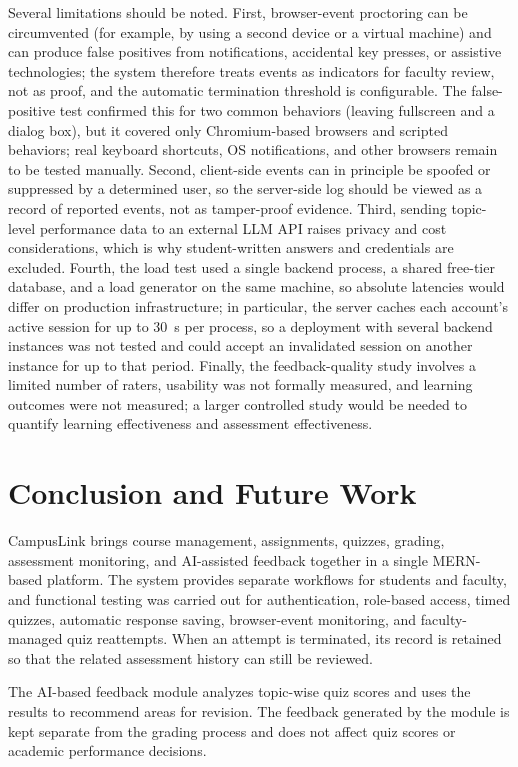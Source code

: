 \documentclass[conference]{IEEEtran}
\begin{document}
Several limitations should be noted. First, browser-event proctoring can be circumvented (for example, by using a second device or a virtual machine) and can produce false positives from notifications, accidental key presses, or assistive technologies; the system therefore treats events as indicators for faculty review, not as proof, and the automatic termination threshold is configurable. The false-positive test confirmed this for two common behaviors (leaving fullscreen and a dialog box), but it covered only Chromium-based browsers and scripted behaviors; real keyboard shortcuts, OS notifications, and other browsers remain to be tested manually. Second, client-side events can in principle be spoofed or suppressed by a determined user, so the server-side log should be viewed as a record of reported events, not as tamper-proof evidence. Third, sending topic-level performance data to an external LLM API raises privacy and cost considerations, which is why student-written answers and credentials are excluded. Fourth, the load test used a single backend process, a shared free-tier database, and a load generator on the same machine, so absolute latencies would differ on production infrastructure; in particular, the server caches each account's active session for up to 30~s per process, so a deployment with several backend instances was not tested and could accept an invalidated session on another instance for up to that period. Finally, the feedback-quality study involves a limited number of raters, usability was not formally measured, and learning outcomes were not measured; a larger controlled study would be needed to quantify learning effectiveness and assessment effectiveness.

\section{Conclusion and Future Work}
\label{sec:conclusion}

CampusLink brings course management, assignments, quizzes, grading, assessment monitoring, and AI-assisted feedback together in a single MERN-based platform. The system provides separate workflows for students and faculty, and functional testing was carried out for authentication, role-based access, timed quizzes, automatic response saving, browser-event monitoring, and faculty-managed quiz reattempts. When an attempt is terminated, its record is retained so that the related assessment history can still be reviewed.

The AI-based feedback module analyzes topic-wise quiz scores and uses the results to recommend areas for revision. The feedback generated by the module is kept separate from the grading process and does not affect quiz scores or academic performance decisions.
\end{document}
